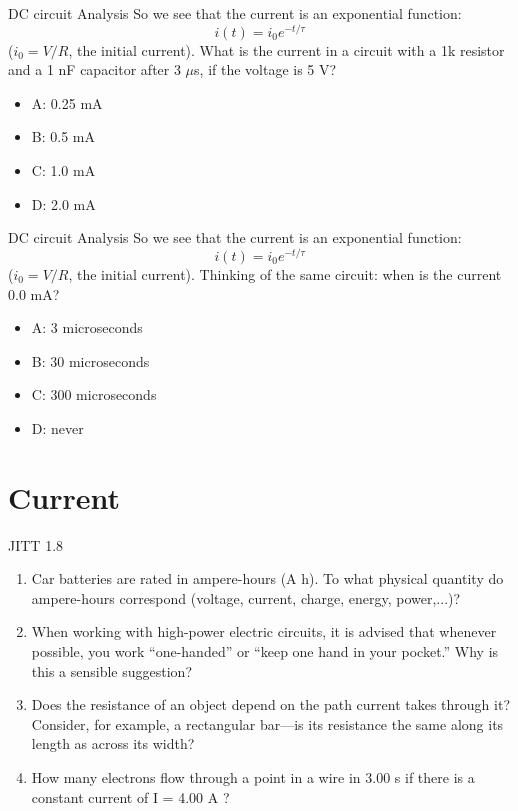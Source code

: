 \documentclass{beamer}
\begin{document}
\begin{frame}{DC circuit Analysis}
So we see that the current is an exponential function:
\begin{equation}
i(t) = i_0 e^{-t/\tau}
\end{equation}
($i_0 = V/R$, the initial current).  What is the current in a circuit with a 1k resistor and a 1 nF capacitor after 3 $\mu$s, if the voltage is 5 V?
\begin{itemize}
\item A: 0.25 mA
\item B: 0.5 mA
\item C: 1.0 mA
\item D: 2.0 mA
\end{itemize}
\end{frame}

\begin{frame}{DC circuit Analysis}
So we see that the current is an exponential function:
\begin{equation}
i(t) = i_0 e^{-t/\tau}
\end{equation}
($i_0 = V/R$, the initial current).  Thinking of the same circuit: when is the current 0.0 mA?
\begin{itemize}
\item A: 3 microseconds
\item B: 30 microseconds
\item C: 300 microseconds
\item D: never
\end{itemize}
\end{frame}

\section{Current}

\begin{frame}{JITT 1.8}
\begin{enumerate}
\item Car batteries are rated in ampere-hours (A h). To what physical quantity do ampere-hours correspond (voltage, current, charge, energy, power,...)?
\item When working with high-power electric circuits, it is advised that whenever possible, you work “one-handed” or “keep one hand in your pocket.” Why is this a sensible suggestion?
\item Does the resistance of an object depend on the path current takes through it? Consider, for example, a rectangular bar—is its resistance the same along its length as across its width?
\item How many electrons flow through a point in a wire in 3.00 s if there is a constant current of I = 4.00 A ?
\end{enumerate}
\end{frame}
\end{document}
